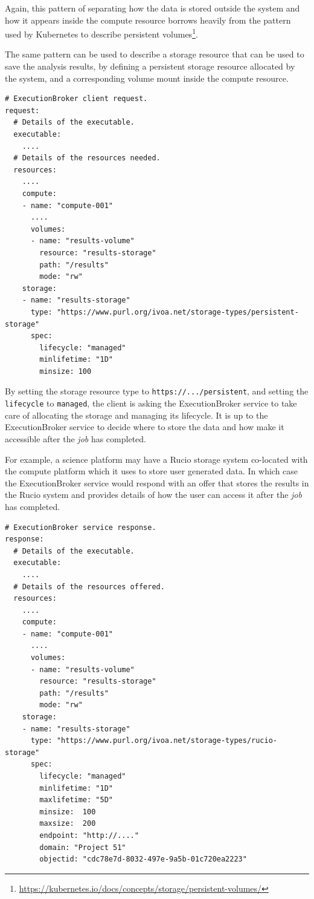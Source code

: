 \documentclass[11pt,a4paper]{ivoa}
\newcommand{\execbrokerclass} {ExecutionBroker}
\newcommand{\rucio} {Rucio}
\newcommand{\kubernetes} {Kubernetes}
\newcommand{\codeword}[1] {\texttt{#1}}
\newcommand{\footurl}[1] {\footnote{\url{#1}}}
\newcommand{\job} {\textit{job}}
\begin{document}
Again, this pattern of separating how the data is stored outside the system
and how it appears inside the compute resource borrows heavily from the
pattern used by \kubernetes{} to describe persistent
volumes\footurl{https://kubernetes.io/docs/concepts/storage/persistent-volumes/}.

The same pattern can be used to describe a storage resource that can be used
to save the analysis results, by defining a persistent storage resource
allocated by the system, and a corresponding volume mount inside the compute resource.

\begin{lstlisting}[]
# ExecutionBroker client request.
request:
  # Details of the executable.
  executable:
    ....
  # Details of the resources needed.
  resources:
    ....
    compute:
    - name: "compute-001"
      ....
      volumes:
      - name: "results-volume"
        resource: "results-storage"
        path: "/results"
        mode: "rw"
    storage:
    - name: "results-storage"
      type: "https://www.purl.org/ivoa.net/storage-types/persistent-storage"
      spec:
        lifecycle: "managed"
        minlifetime: "1D"
        minsize: 100
\end{lstlisting}

By setting the storage resource type to \codeword{https://.../persistent},
and setting the \codeword{lifecycle} to \codeword{managed},
the client is asking the \execbrokerclass{} service to take care of allocating
the storage and managing its lifecycle.
It is up to the \execbrokerclass{} service to decide where to store the data and
how make it accessible after the \job{} has completed.

For example, a science platform may have a \rucio{} storage system co-located
with the compute platform which it uses to store user generated data.
In which case the \execbrokerclass{} service would respond with an offer that
stores the results in the \rucio{} system and provides details of how the user
can access it after the \job{} has completed.

\begin{lstlisting}[]
# ExecutionBroker service response.
response:
  # Details of the executable.
  executable:
    ....
  # Details of the resources offered.
  resources:
    ....
    compute:
    - name: "compute-001"
      ....
      volumes:
      - name: "results-volume"
        resource: "results-storage"
        path: "/results"
        mode: "rw"
    storage:
    - name: "results-storage"
      type: "https://www.purl.org/ivoa.net/storage-types/rucio-storage"
      spec:
        lifecycle: "managed"
        minlifetime: "1D"
        maxlifetime: "5D"
        minsize:  100
        maxsize:  200
        endpoint: "http://...."
        domain: "Project 51"
        objectid: "cdc78e7d-8032-497e-9a5b-01c720ea2223"
\end{lstlisting}
\end{document}
